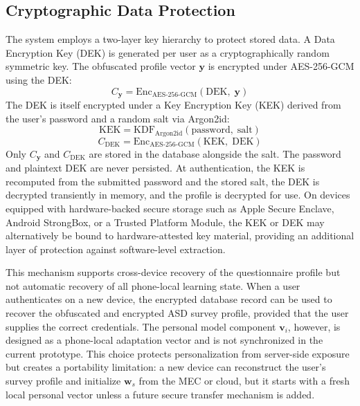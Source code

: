 \documentclass[lettersize,journal]{IEEEtran}
\begin{document}
\subsection{Cryptographic Data Protection}
\label{sec:crypto}

The system employs a two-layer key hierarchy to protect stored data. A
Data Encryption Key (DEK) is generated per user as a cryptographically
random symmetric key. The obfuscated profile vector $\mathbf{y}$ is
encrypted under AES-256-GCM using the DEK:
\begin{equation}
    C_{\mathbf{y}} =
    \mathrm{Enc}_{\mathrm{AES\text{-}256\text{-}GCM}}(\mathrm{DEK},\;\mathbf{y})
\end{equation}
The DEK is itself encrypted under a Key Encryption Key (KEK) derived
from the user's password and a random salt via Argon2id:
\begin{equation}
    \mathrm{KEK} = \mathrm{KDF}_{\mathrm{Argon2id}}(\mathrm{password},\;\mathrm{salt})
\end{equation}
\begin{equation}
    C_{\mathrm{DEK}} =
    \mathrm{Enc}_{\mathrm{AES\text{-}256\text{-}GCM}}(\mathrm{KEK},\;\mathrm{DEK})
\end{equation}
Only $C_{\mathbf{y}}$ and $C_{\mathrm{DEK}}$ are stored in the
database alongside the salt. The password and plaintext DEK are never
persisted. At authentication, the KEK is recomputed from the submitted
password and the stored salt, the DEK is decrypted transiently in
memory, and the profile is decrypted for use. On devices equipped with
hardware-backed secure storage such as Apple Secure Enclave, Android
StrongBox, or a Trusted Platform Module, the KEK or DEK may
alternatively be bound to hardware-attested key material, providing an
additional layer of protection against software-level extraction.

This mechanism supports cross-device recovery of the questionnaire
profile but not automatic recovery of all phone-local learning state.
When a user authenticates on a new device, the encrypted database record
can be used to recover the obfuscated and encrypted ASD survey profile,
provided that the user supplies the correct credentials. The personal
model component $\mathbf{v}_i$, however, is designed as a phone-local
adaptation vector and is not synchronized in the current prototype. This
choice protects personalization from server-side exposure but creates a
portability limitation: a new device can reconstruct the user's survey
profile and initialize $\mathbf{w}_s$ from the MEC or cloud, but it
starts with a fresh local personal vector unless a future secure
transfer mechanism is added.
\end{document}
